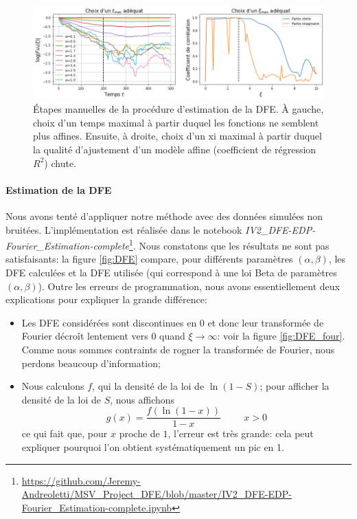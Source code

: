 \documentclass[12pt]{article}
\newcommand{\esp}{\hspace{1cm}}
\begin{document}
\begin{figure}[h]
  \begin{center}
    \includegraphics[width=0.95\linewidth]{../Img/DFE_choix_tmax_xi.png}
  \end{center}
  \caption{\label{fig:DFE_choix}Étapes manuelles de la procédure d'estimation de la DFE. À gauche, choix d'un temps maximal à partir duquel les fonctions ne semblent plus affines. Ensuite, à droite, choix d'un xi maximal à partir duquel la qualité d'ajustement d'un modèle affine (coefficient de régression $R^2$) chute.}
\end{figure}

\FloatBarrier
\paragraph{Estimation de la DFE}

Nous avons tenté d'appliquer notre méthode avec des données simulées non bruitées. L'implémentation est réalisée dans le notebook \emph{IV2\_DFE-EDP-Fourier\_Estimation-complete}\footnote{\url{https://github.com/Jeremy-Andreoletti/MSV_Project_DFE/blob/master/IV2_DFE-EDP-Fourier_Estimation-complete.ipynb}}. Nous constatons que les résultats ne sont pas satisfaisants: la figure \ref{fig:DFE} compare, pour différents paramètres $(\alpha,\beta)$, les DFE calculées et la DFE utilisée (qui correspond à une loi Beta de paramètres $(\alpha,\beta)$). Outre les erreurs de programmation, nous avons essentiellement deux explications pour expliquer la grande différence:
\begin{itemize}
	\item Les DFE considérées sont discontinues en 0 et donc leur transformée de Fourier décroît lentement vers 0 quand $\xi\to\infty$: voir la figure \ref{fig:DFE_four}. Comme nous sommes contraints de rogner la transformée de Fourier, nous perdons beaucoup d'information;
	\item Nous calculons $f$, qui la densité de la loi de $\ln(1-S)$; pour afficher la densité de la loi de $S$, nous affichons \[g(x)=\frac{f(\ln (1-x))}{1-x}\esp x>0\] ce qui fait que, pour $x$ proche de $1$, l'erreur est très grande: cela peut expliquer pourquoi l'on obtient systématiquement un pic en 1.
\end{itemize}
\end{document}
